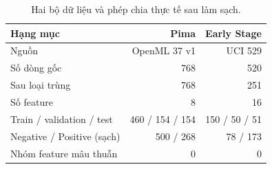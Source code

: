 \par\FloatBarrier\begin{table}[H]\centering\small{}\setlength{\tabcolsep}{5pt}
\caption{Hai bộ dữ liệu và phép chia thực tế sau làm sạch.}\begin{tabular}{P{4.2cm}rr}\toprule
Hạng mục & Pima & Early Stage\\\midrule
Nguồn & OpenML 37 v1 & UCI 529\\
Số dòng gốc & 768 & 520\\
Sau loại trùng & 768 & 251\\
Số feature & 8 & 16\\
Train / validation / test & 460 / 154 / 154 & 150 / 50 / 51\\
Negative / Positive (sạch) & 500 / 268 & 78 / 173\\
Nhóm feature mâu thuẫn & 0 & 0\\\bottomrule\end{tabular}\end{table}
